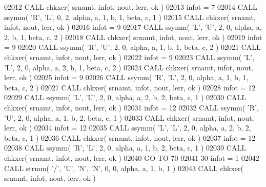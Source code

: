 \begin{DoxyCode}
02012       \textcolor{keyword}{CALL }chkxer( srnamt, infot, nout, lerr, ok )
02013       infot = 7
02014       \textcolor{keyword}{CALL }ssymm( \textcolor{stringliteral}{'R'}, \textcolor{stringliteral}{'L'}, 0, 2, alpha, a, 1, b, 1, beta, c, 1 )
02015       \textcolor{keyword}{CALL }chkxer( srnamt, infot, nout, lerr, ok )
02016       infot = 9
02017       \textcolor{keyword}{CALL }ssymm( \textcolor{stringliteral}{'L'}, \textcolor{stringliteral}{'U'}, 2, 0, alpha, a, 2, b, 1, beta, c, 2 )
02018       \textcolor{keyword}{CALL }chkxer( srnamt, infot, nout, lerr, ok )
02019       infot = 9
02020       \textcolor{keyword}{CALL }ssymm( \textcolor{stringliteral}{'R'}, \textcolor{stringliteral}{'U'}, 2, 0, alpha, a, 1, b, 1, beta, c, 2 )
02021       \textcolor{keyword}{CALL }chkxer( srnamt, infot, nout, lerr, ok )
02022       infot = 9
02023       \textcolor{keyword}{CALL }ssymm( \textcolor{stringliteral}{'L'}, \textcolor{stringliteral}{'L'}, 2, 0, alpha, a, 2, b, 1, beta, c, 2 )
02024       \textcolor{keyword}{CALL }chkxer( srnamt, infot, nout, lerr, ok )
02025       infot = 9
02026       \textcolor{keyword}{CALL }ssymm( \textcolor{stringliteral}{'R'}, \textcolor{stringliteral}{'L'}, 2, 0, alpha, a, 1, b, 1, beta, c, 2 )
02027       \textcolor{keyword}{CALL }chkxer( srnamt, infot, nout, lerr, ok )
02028       infot = 12
02029       \textcolor{keyword}{CALL }ssymm( \textcolor{stringliteral}{'L'}, \textcolor{stringliteral}{'U'}, 2, 0, alpha, a, 2, b, 2, beta, c, 1 )
02030       \textcolor{keyword}{CALL }chkxer( srnamt, infot, nout, lerr, ok )
02031       infot = 12
02032       \textcolor{keyword}{CALL }ssymm( \textcolor{stringliteral}{'R'}, \textcolor{stringliteral}{'U'}, 2, 0, alpha, a, 1, b, 2, beta, c, 1 )
02033       \textcolor{keyword}{CALL }chkxer( srnamt, infot, nout, lerr, ok )
02034       infot = 12
02035       \textcolor{keyword}{CALL }ssymm( \textcolor{stringliteral}{'L'}, \textcolor{stringliteral}{'L'}, 2, 0, alpha, a, 2, b, 2, beta, c, 1 )
02036       \textcolor{keyword}{CALL }chkxer( srnamt, infot, nout, lerr, ok )
02037       infot = 12
02038       \textcolor{keyword}{CALL }ssymm( \textcolor{stringliteral}{'R'}, \textcolor{stringliteral}{'L'}, 2, 0, alpha, a, 1, b, 2, beta, c, 1 )
02039       \textcolor{keyword}{CALL }chkxer( srnamt, infot, nout, lerr, ok )
02040       \textcolor{keywordflow}{GO TO} 70
02041    30 infot = 1
02042       \textcolor{keyword}{CALL }strmm( \textcolor{stringliteral}{'/'}, \textcolor{stringliteral}{'U'}, \textcolor{stringliteral}{'N'}, \textcolor{stringliteral}{'N'}, 0, 0, alpha, a, 1, b, 1 )
02043       \textcolor{keyword}{CALL }chkxer( srnamt, infot, nout, lerr, ok )

\end{DoxyCode}
